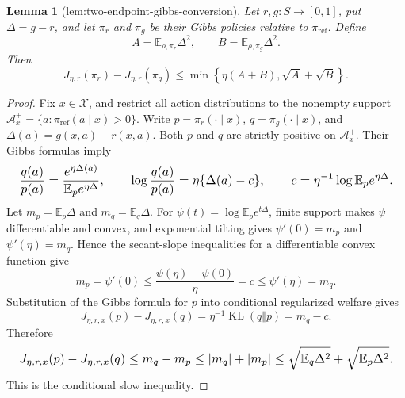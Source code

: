 \documentclass{article}
\newtheorem{lemma}{Lemma}
\begin{document}
\begin{lemma}[lem:two-endpoint-gibbs-conversion]\label{lem:two-endpoint-gibbs-conversion}
Let \(r,g:S\to[0,1]\), put \(\Delta=g-r\), and let \(\pi_r\) and \(\pi_g\) be their Gibbs policies relative to \(\pi_{\mathrm{ref}}\). Define
\[
A=\mathbb E_{\rho,\pi_r}\Delta^2,
\qquad
B=\mathbb E_{\rho,\pi_g}\Delta^2.
\]
Then
\[
J_{\eta,r}(\pi_r)-J_{\eta,r}(\pi_g)
\le\min\left\{\eta(A+B),\sqrt A+\sqrt B\right\}.
\]
\end{lemma}
\begin{proof}
Fix \(x\in\mathcal X\), and restrict all action distributions to the nonempty support \(\mathcal A_x^+=\{a:\pi_{\mathrm{ref}}(a\mid x)>0\}\). Write \(p=\pi_r(\cdot\mid x)\), \(q=\pi_g(\cdot\mid x)\), and \(\Delta(a)=g(x,a)-r(x,a)\). Both \(p\) and \(q\) are strictly positive on \(\mathcal A_x^+\). Their Gibbs formulas imply
\[
\makebox[\linewidth][c]{\resizebox{0.98\linewidth}{!}{\(\displaystyle \frac{q(a)}{p(a)}=\frac{e^{\eta\Delta(a)}}{\mathbb E_p e^{\eta\Delta}},
\qquad
\log\frac{q(a)}{p(a)}=\eta\{\Delta(a)-c\},
\qquad
c=\eta^{-1}\log\mathbb E_p e^{\eta\Delta}.\)}}
\]
Let \(m_p=\mathbb E_p\Delta\) and \(m_q=\mathbb E_q\Delta\). For \(\psi(t)=\log\mathbb E_p e^{t\Delta}\), finite support makes \(\psi\) differentiable and convex, and exponential tilting gives \(\psi'(0)=m_p\) and \(\psi'(\eta)=m_q\). Hence the secant-slope inequalities for a differentiable convex function give
\[
m_p=\psi'(0)\le\frac{\psi(\eta)-\psi(0)}{\eta}=c\le\psi'(\eta)=m_q.
\]
Substitution of the Gibbs formula for \(p\) into conditional regularized welfare gives
\[
J_{\eta,r,x}(p)-J_{\eta,r,x}(q)
=\eta^{-1}\operatorname{KL}(q\Vert p)
=m_q-c.
\]
Therefore
\[
\makebox[\linewidth][c]{\resizebox{0.98\linewidth}{!}{\(\displaystyle J_{\eta,r,x}(p)-J_{\eta,r,x}(q)
\le m_q-m_p
\le |m_q|+|m_p|
\le\sqrt{\mathbb E_q\Delta^2}+\sqrt{\mathbb E_p\Delta^2}.\)}}
\]
This is the conditional slow inequality.


\end{proof}
\end{document}
